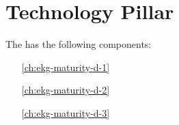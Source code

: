 \part{Technology Pillar}\label{pt:ekg-maturity-d} %

The \currentname has the following components:

\begin{itemize}[leftmargin=.5in]
    \item [\ref{ch:ekg-maturity-d-1}] 
    \item [\ref{ch:ekg-maturity-d-2}] 
    \item [\ref{ch:ekg-maturity-d-3}] 
\end{itemize}

%
%
%
%
%




